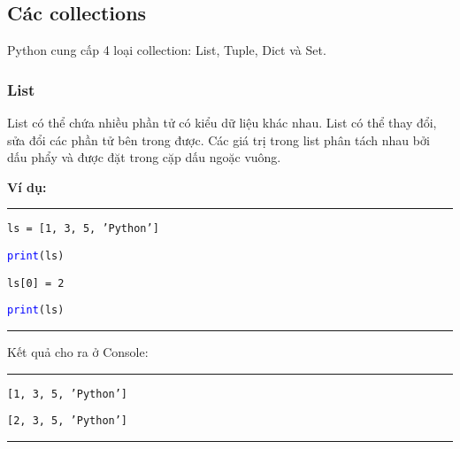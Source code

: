 \subsection{Các collections}
Python cung cấp 4 loại collection: List, Tuple, Dict và Set.
\subsubsection{List}
List có thể chứa nhiều phần tử có kiểu dữ liệu khác nhau. List có thể thay đổi, sửa đổi các phần tử bên trong được. Các giá trị trong list phân tách nhau bởi dấu phẩy và được đặt trong cặp dấu ngoặc vuông.\par
\textbf{Ví dụ:}\\
\rule{\linewidth}{0.2mm}\par
\begin{linenumbers}
	\texttt{ls = [1, 3, 5, 'Python']}\par
	\texttt{\textcolor{blue}{print}(ls)}\par
	\texttt{ls[0] = 2}\par
	\texttt{\textcolor{blue}{print}(ls)}\par
\end{linenumbers}
\rule{\linewidth}{0.2mm}\par
\noindent
\resetlinenumber
Kết quả cho ra ở Console:\\
\rule{\linewidth}{0.2mm}\par
\begin{linenumbers}
	\texttt{[1, 3, 5, 'Python']}\par
	\texttt{[2, 3, 5, 'Python']}\par
\end{linenumbers}
\rule{\linewidth}{0.2mm}\par
\resetlinenumber
